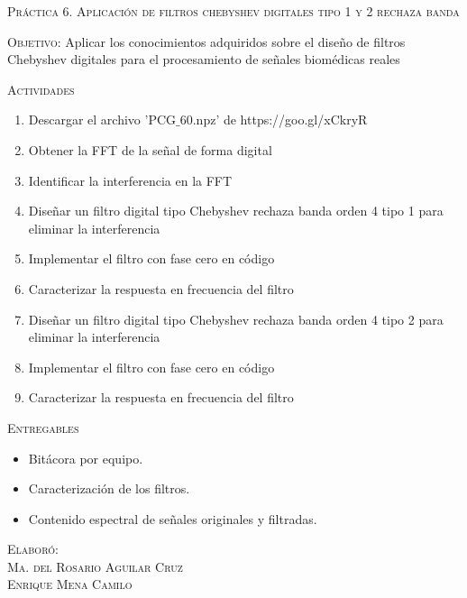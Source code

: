 \documentclass[10pt,letterpaper,spanish,twoside]{report}
\begin{document}
\docdate

\begin{center}
 \textsc{\asignatura}\vspace{.2em}
\end{center}

\textsc{Práctica 6. Aplicación de filtros chebyshev digitales tipo 1 y 2 rechaza banda}

\textsc{Objetivo:} 
Aplicar los conocimientos adquiridos sobre el diseño de filtros Chebyshev digitales para el procesamiento de señales biomédicas reales

\textsc{Actividades}
\begin{enumerate}
  \item Descargar el archivo 'PCG$\_$60.npz' de https://goo.gl/xCkryR
  \item Obtener la FFT de la señal de forma digital
  \item Identificar la interferencia en la FFT
  \item Diseñar un filtro digital tipo Chebyshev rechaza banda orden 4 tipo 1 para eliminar la interferencia
  \item Implementar el filtro con fase cero en código
  \item Caracterizar la respuesta en frecuencia del filtro
  \item Diseñar un filtro digital tipo Chebyshev rechaza banda orden 4 tipo 2 para eliminar la interferencia
  \item Implementar el filtro con fase cero en código
  \item Caracterizar la respuesta en frecuencia del filtro
\end{enumerate}

\textsc{Entregables}
\begin{itemize}
  \item Bitácora por equipo.
  \item Caracterización de los filtros.
  \item Contenido espectral de señales originales y filtradas.
\end{itemize}

\vfill
\begin{flushright}
\textsc{Elaboró:\\
Ma. del Rosario Aguilar Cruz\\
Enrique Mena Camilo}
\end{flushright}
\end{document}
